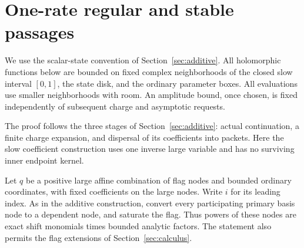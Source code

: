 \section{One-rate regular and stable passages}\label{sec:regular}

We use the scalar-state convention of Section~\ref{sec:additive}.
All holomorphic functions below are bounded on fixed complex neighborhoods
of the closed slow interval $[0,1]$, the state disk, and the ordinary
parameter boxes.  All evaluations use smaller neighborhoods with room.
An amplitude bound, once chosen, is fixed independently of subsequent
charge and asymptotic requests.

The proof follows the three stages of Section~\ref{sec:additive}:
actual continuation, a finite charge expansion, and dispersal of its
coefficients into packets.  Here the slow coefficient construction
uses one inverse large variable and has no surviving inner endpoint
kernel.

Let $q$ be a positive large affine combination of flag nodes and bounded
ordinary coordinates, with fixed coefficients on the large nodes.  Write
$i$ for its leading index.  As in the additive construction, convert every
participating primary basis node to a dependent node, and saturate the
flag.  Thus powers of these nodes are exact shift monomials times bounded
analytic factors.  The statement also permits the flag extensions of
Section~\ref{sec:calculus}.

